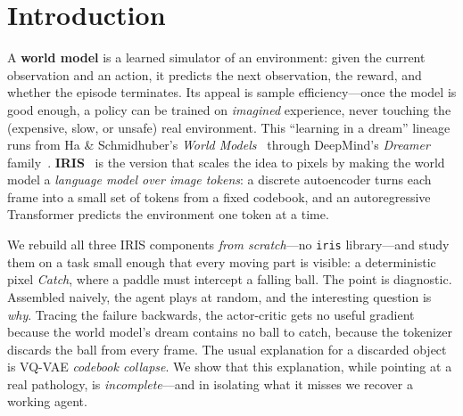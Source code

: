 \documentclass[11pt]{article}
\begin{document}
\section{Introduction}
\label{sec:intro}
A \textbf{world model} is a learned simulator of an environment: given the
current observation and an action, it predicts the next observation, the reward,
and whether the episode terminates. Its appeal is sample efficiency---once the
model is good enough, a policy can be trained on \emph{imagined} experience,
never touching the (expensive, slow, or unsafe) real environment. This
``learning in a dream'' lineage runs from Ha \& Schmidhuber's \emph{World
Models}~\cite{worldmodels} through DeepMind's \emph{Dreamer}
family~\cite{dreamer,dreamerv2,dreamerv3}. \textbf{IRIS}~\cite{iris} is the
version that scales the idea to pixels by making the world model a
\emph{language model over image tokens}: a discrete autoencoder turns each frame
into a small set of tokens from a fixed codebook, and an autoregressive
Transformer predicts the environment one token at a time.

We rebuild all three IRIS components \emph{from scratch}---no \texttt{iris}
library---and study them on a task small enough that every moving part is
visible: a deterministic pixel \emph{Catch}, where a paddle must intercept a
falling ball. The point is diagnostic. Assembled naively, the agent plays at
random, and the interesting question is \emph{why}. Tracing the failure
backwards, the actor-critic gets no useful gradient because the world model's
dream contains no ball to catch, because the tokenizer discards the ball from
every frame. The usual explanation for a discarded object is VQ-VAE
\emph{codebook collapse}. We show that this explanation, while pointing at a real
pathology, is \emph{incomplete}---and in isolating what it misses we recover a
working agent.
\end{document}

